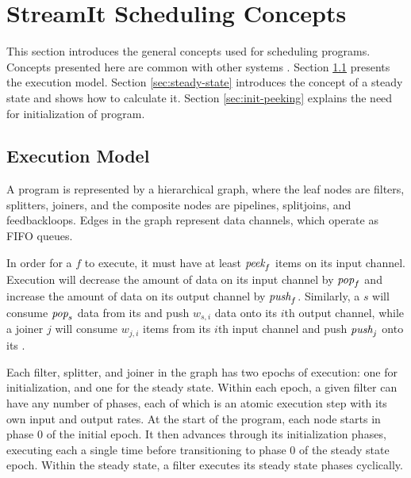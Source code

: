 \section{StreamIt Scheduling Concepts}
\label{chpt:sched-basic}

This section introduces the general concepts used for scheduling
{\StreamIt} programs.  Concepts presented here are common with other
systems \cite{ptolemyoverview}.  Section \ref{sec:exec-model} presents
the {\StreamIt} execution model. Section \ref{sec:steady-state}
introduces the concept of a steady state and shows how to calculate
it. Section \ref{sec:init-peeking} explains the need for
initialization of {\StreamIt} program.

\subsection{{\StreamIt} Execution Model}
\label{sec:exec-model}

A {\StreamIt} program is represented by a hierarchical graph, where
the leaf nodes are filters, splitters, joiners, and the composite
nodes are pipelines, splitjoins, and feedbackloops.  Edges in the
graph represent data channels, which operate as FIFO queues.

In order for a {\filter} $f$ to execute, it must have at least
$\mbox{\it peek}_f$ items on its input channel.  Execution will decrease the
amount of data on its input channel by $\mbox{\it pop}_f$ and increase the
amount of data on its output channel by $\mbox{\it push}_f$. Similarly, a
{\splitter} $s$ will consume $\mbox{\it pop}_s$ data from its {\Input}
{\Channel} and push $w_{s,i}$ data onto its $i$th output channel,
while a joiner $j$ will consume $w_{j,i}$ items from its $i$th input
channel and push $\mbox{\it push}_j$ onto its {\Output} {\Channel}.

Each filter, splitter, and joiner in the graph has two epochs of
execution: one for initialization, and one for the steady state.
Within each epoch, a given filter can have any number of phases, each
of which is an atomic execution step with its own input and output
rates.  At the start of the program, each node starts in phase $0$ of
the initial epoch.  It then advances through its initialization
phases, executing each a single time before transitioning to phase $0$
of the steady state epoch.  Within the steady state, a filter executes
its steady state phases cyclically.

